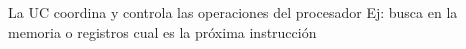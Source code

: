 \documentclass[preview]{standalone}
\begin{document}
La UC coordina y controla las operaciones del procesador                            Ej: busca en la memoria o registros cual es la próxima instrucción\\
\end{document}

